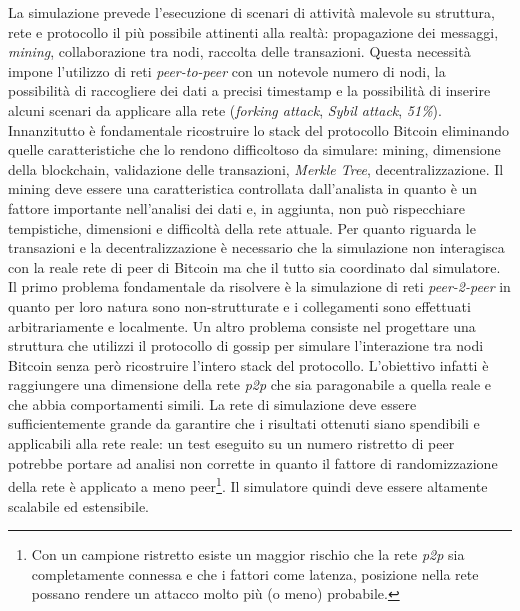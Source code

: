 La simulazione prevede l'esecuzione di scenari di attività malevole su struttura, rete e protocollo il più possibile attinenti alla realtà: propagazione dei messaggi, \textit{mining}, collaborazione tra nodi, raccolta delle transazioni. Questa necessità impone l'utilizzo di reti \textit{peer-to-peer} con un notevole numero di nodi, la possibilità di raccogliere dei dati a precisi timestamp e la possibilità di inserire alcuni scenari da applicare alla rete (\textit{forking attack}, \textit{Sybil attack}, \textit{51\%}).\newline
Innanzitutto è fondamentale ricostruire lo stack del protocollo Bitcoin eliminando quelle caratteristiche che lo rendono difficoltoso da simulare: mining, dimensione della blockchain, validazione delle transazioni, \textit{Merkle Tree}, decentralizzazione.\newline
Il mining deve essere una caratteristica controllata dall'analista in quanto è un fattore importante nell'analisi dei dati e, in aggiunta, non può rispecchiare tempistiche, dimensioni e difficoltà della rete attuale.\newline
Per quanto riguarda le transazioni e la decentralizzazione è necessario che la simulazione non interagisca con la reale rete di peer di Bitcoin ma che il tutto sia coordinato dal simulatore.\newline
Il primo problema fondamentale da risolvere è la simulazione di reti \textit{peer-2-peer} in quanto per loro natura sono non-strutturate e i collegamenti sono effettuati arbitrariamente e localmente. Un altro problema consiste nel progettare una struttura che utilizzi il protocollo di gossip per simulare l'interazione tra nodi Bitcoin senza però ricostruire l'intero stack del protocollo. L'obiettivo infatti è raggiungere una dimensione della rete \textit{p2p} che sia paragonabile a quella reale e che abbia comportamenti simili. La rete di simulazione deve essere sufficientemente grande da garantire che i risultati ottenuti siano spendibili e applicabili alla rete reale: un test eseguito su un numero ristretto di peer potrebbe portare ad analisi non corrette in quanto il fattore di randomizzazione della rete è applicato a meno peer\footnote{Con un campione ristretto esiste un maggior rischio che la rete \textit{p2p} sia completamente connessa e che i fattori come latenza, posizione nella rete possano rendere un attacco molto più (o meno) probabile.}.\newline
Il simulatore quindi deve essere altamente scalabile ed estensibile.\newline
